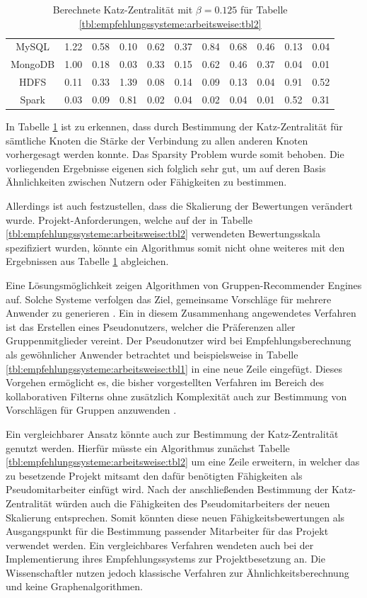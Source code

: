 \begin{table}[h]
\begin{tabular}{c|c|c|c|c|c|c|c|c|c|c}
		MySQL    & 1.22 & 0.58 & 0.10 & 0.62 & 0.37 & 0.84 & 0.68 & 0.46 & 0.13 & 0.04\\
		MongoDB  & 1.00 & 0.18 & 0.03 & 0.33 & 0.15 & 0.62 & 0.46 & 0.37 & 0.04 & 0.01\\
		HDFS     & 0.11 & 0.33 & 1.39 & 0.08 & 0.14 & 0.09 & 0.13 & 0.04 & 0.91 & 0.52\\
		Spark    & 0.03 & 0.09 & 0.81 & 0.02 & 0.04 & 0.02 & 0.04 & 0.01 & 0.52 & 0.31
	\end{tabular}
	\caption{Berechnete Katz-Zentralität mit $\beta = 0.125$ für Tabelle \ref{tbl:empfehlungssysteme:arbeitsweise:tbl2}}
	\label{tbl:empfehlungssysteme:arbeitsweise:tbl3}
\end{table}

In Tabelle \ref{tbl:empfehlungssysteme:arbeitsweise:tbl3} ist zu erkennen, dass durch Bestimmung der Katz-Zentralität für sämtliche Knoten die Stärke der Verbindung zu allen anderen Knoten vorhergesagt werden konnte. Das Sparsity Problem wurde somit behoben. Die vorliegenden Ergebnisse eigenen sich folglich sehr gut, um auf deren Basis Ähnlichkeiten zwischen Nutzern oder Fähigkeiten zu bestimmen.

Allerdings ist auch festzustellen, dass die Skalierung der Bewertungen verändert wurde. Projekt-Anforderungen, welche auf der in Tabelle \ref{tbl:empfehlungssysteme:arbeitsweise:tbl2} verwendeten Bewertungsskala spezifiziert wurden, könnte ein Algorithmus somit nicht ohne weiteres mit den Ergebnissen aus Tabelle \ref{tbl:empfehlungssysteme:arbeitsweise:tbl3} abgleichen.

Eine Lösungsmöglichkeit zeigen Algorithmen von Gruppen-Recommender Engines auf. Solche Systeme verfolgen das Ziel, gemeinsame Vorschläge für mehrere Anwender zu generieren \cite[S. 1]{dara:2020}. Ein in diesem Zusammenhang angewendetes Verfahren ist das Erstellen eines Pseudonutzers, welcher die Präferenzen aller Gruppenmitglieder vereint. Der Pseudonutzer wird bei Empfehlungsberechnung als gewöhnlicher Anwender betrachtet und beispielsweise in Tabelle \ref{tbl:empfehlungssysteme:arbeitsweise:tbl1} in eine neue Zeile eingefügt. Dieses Vorgehen ermöglicht es, die bisher vorgestellten Verfahren im Bereich des kollaborativen Filterns ohne zusätzlich Komplexität auch zur Bestimmung von Vorschlägen für Gruppen anzuwenden \cite[S. 8f.]{oconnor:2001}.

Ein vergleichbarer Ansatz könnte auch zur Bestimmung der Katz-Zentralität genutzt werden. Hierfür müsste ein Algorithmus zunächst Tabelle \ref{tbl:empfehlungssysteme:arbeitsweise:tbl2} um eine Zeile erweitern, in welcher das zu besetzende Projekt mitsamt den dafür benötigten Fähigkeiten als Pseudomitarbeiter einfügt wird. Nach der anschließenden Bestimmung der Katz-Zentralität würden auch die Fähigkeiten des Pseudomitarbeiters der neuen Skalierung entsprechen. Somit könnten diese neuen Fähigkeitsbewertungen als Ausgangspunkt für die Bestimmung passender Mitarbeiter für das Projekt verwendet werden. Ein vergleichbares Verfahren wendeten auch \textcite[S. 2]{mitre:2014} bei der Implementierung ihres Empfehlungssystems zur Projektbesetzung an. Die Wissenschaftler nutzen jedoch klassische Verfahren zur Ähnlichkeitsberechnung und keine Graphenalgorithmen.

